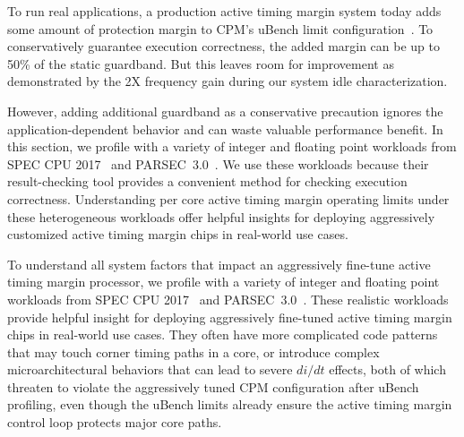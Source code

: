 To run real applications, a production active timing margin system today adds some amount of protection margin to CPM's uBench limit configuration~\cite{lefurgy2011active}. To conservatively guarantee execution correctness, the added margin can be up to 50\% of the static guardband. But this leaves room for improvement as demonstrated by the 2X frequency gain during our system idle characterization. 

However, adding additional guardband as a conservative precaution ignores the application-dependent behavior and can waste valuable performance benefit. In this section, we profile with a variety of integer and floating point workloads from SPEC CPU 2017~\cite{SPEC2017} and PARSEC~3.0~\cite{bienia2008parsec}. We use these workloads because their result-checking tool provides a convenient method for checking execution correctness. Understanding per core active timing margin operating limits under these heterogeneous workloads offer helpful insights for deploying aggressively customized active timing margin chips in real-world use cases.

To understand all system factors that impact an aggressively fine-tune active timing margin processor, we profile with a variety of integer and floating point workloads from SPEC CPU 2017~\cite{SPEC2017} and PARSEC~3.0~\cite{bienia2008parsec}. These realistic workloads provide helpful insight for deploying aggressively fine-tuned active timing margin chips in real-world use cases. They often have more complicated code patterns that may touch corner timing paths in a core, or introduce complex microarchitectural behaviors that can lead to severe $di/dt$ effects, both of which threaten to violate the aggressively tuned CPM configuration after uBench profiling, even though the uBench limits already ensure the active timing margin control loop protects major core paths. 


